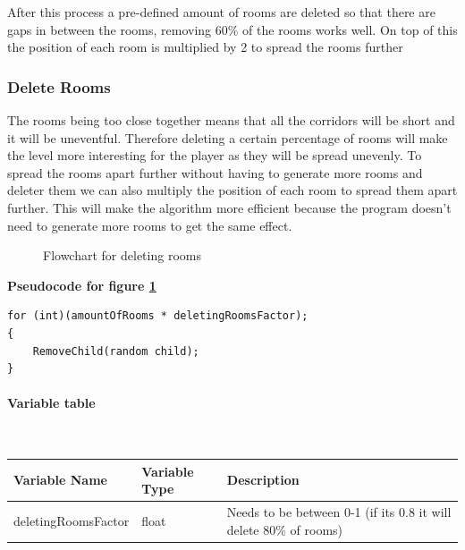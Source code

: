 \documentclass{article}
\newcommand{\myparagraph}[1]{\paragraph{#1}\mbox{}\\} %
\newcommand{\smallBr}{\vspace{1.5mm}}
\begin{document}
After this process a pre-defined amount of rooms are deleted so that there are gaps in between the rooms, removing 60\% of the rooms works well. On top of this the position of each room is multiplied by 2 to spread the rooms further

\subsubsection{Delete Rooms}
The rooms being too close together means that all the corridors will be short and it will be uneventful. Therefore deleting a certain percentage of rooms will make the level more interesting for the player as they will be spread unevenly. To spread the rooms apart further without having to generate more rooms and deleter them we can also multiply the position of each room to spread them apart further. This will make the algorithm more efficient because the program doesn't need to generate more rooms to get the same effect.
\linebreak \linebreak

\begin{figure}[h]
  \centering
  \caption{Flowchart for deleting rooms}
  \label{deleting flowchart}
\end{figure}

\textbf{Pseudocode for figure \ref{deleting flowchart}}
\begin{lstlisting}
for (int)(amountOfRooms * deletingRoomsFactor);
{
    RemoveChild(random child);
}
\end{lstlisting}

\myparagraph{Variable table}
\smallBr
\begin{tabular}{l|l|l}
Variable Name       & Variable Type & Description                                                         \\ \hline
deletingRoomsFactor & float         & Needs to be between 0-1 (if its 0.8 it will delete 80\% of rooms)
\end{tabular}
\end{document}
